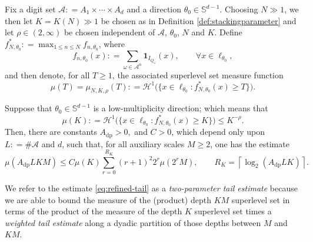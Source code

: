 \documentclass[12pt]{amsart}
\numberwithin{equation}{section}
\begin{document}
\begin{theorem}\label{thm:refined-tail}
Fix a digit set $\mathcal{A} : = A_1 \times \cdots \times A_d$ and a direction $\theta_0 \in \mathbb{S}^{d-1}$. Choosing $N \gg 1$, we then let $K = K(N) \gg 1$ be chosen as in Definition \ref{def:stackingparameter} and let $\rho \in (2, \infty)$ be chosen independent of $\mathcal{A}$, $\theta_0$, $N$ and $K$. Define $f_{N,\theta_0}^* : = \max_{1 \leq n \leq N} f_{n,\theta_0}$, where
$$
f_{n,\theta_0} (x) : = \sum\limits_{\omega \in \mathcal{A}^n} \mathbf{1}_{I_{Q_{\omega}}} (x), \qquad \forall x \in \ell_{\theta_0},
$$
and then denote, for all $T \geq 1$, the associated superlevel set measure function
$$
\mu (T) = \mu_{N,K,\rho} (T) : = \mathcal{H}^1 \big( \big\{ x \in \ell_{\theta_0} : f_{N,\theta_0}^* (x) \geq T \big\} \big).
$$

\noindent
Suppose that $\theta_0 \in \mathbb{S}^{d-1}$ is a low-multiplicity direction; which means that
$$
\mu (K) : = \mathcal{H}^1 \big(\big\{x \in \ell_{\theta_0} : f_{N,\theta_0}^* (x) \geq K\big\} \big) \leq K^{-\rho}.
$$
Then, there are constants $A_{\mathrm{dp}} > 0,$ and $C>0$, which depend only upon $L : = \# \mathcal{A}$ and $d$, such that, for all auxiliary scales $M \geq 2$, one has the estimate
\begin{equation}\label{eq:refined-tail}
 \mu(A_{\mathrm{dp}}LKM)
 \leq C\mu(K)
 \sum_{r=0}^{R_K}(r+1)^2 2^r\mu(2^rM),
 \qquad
 R_K=\left\lceil\log_2(A_{\mathrm{dp}}LK)\right\rceil.
\end{equation}
\end{theorem}

We refer to the estimate \eqref{eq:refined-tail} as a \textit{two-parameter tail estimate} because we are able to bound the measure of the (product) depth $KM$ superlevel set in terms of the product of the measure of the depth $K$ superlevel set times a \textit{weighted tail estimate} along a dyadic partition of those depths between $M$ and $KM$.
\end{document}
